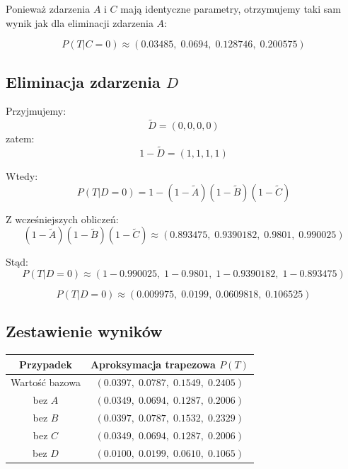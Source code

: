 \documentclass[11pt,a4paper]{article}
\begin{document}
Ponieważ zdarzenia $A$ i $C$ mają identyczne parametry, otrzymujemy taki sam wynik jak dla eliminacji zdarzenia $A$:

\[
P(T|C=0)\approx
(0.03485,\;0.0694,\;0.128746,\;0.200575)
\]

\subsection{Eliminacja zdarzenia $D$}

Przyjmujemy:
\[
\tilde{D}=(0,0,0,0)
\]
zatem:
\[
1-\tilde{D}=(1,1,1,1)
\]

Wtedy:
\[
P(T|D=0)=1-(1-\tilde{A})(1-\tilde{B})(1-\tilde{C})
\]

Z wcześniejszych obliczeń:
\[
(1-\tilde{A})(1-\tilde{B})(1-\tilde{C})\approx
(0.893475,\;0.9390182,\;0.9801,\;0.990025)
\]

Stąd:
\[
P(T|D=0)\approx
(1-0.990025,\;1-0.9801,\;1-0.9390182,\;1-0.893475)
\]

\[
P(T|D=0)\approx
(0.009975,\;0.0199,\;0.0609818,\;0.106525)
\]

\subsection{Zestawienie wyników}

\begin{center}
\begin{tabular}{cc}
\toprule
Przypadek & Aproksymacja trapezowa $P(T)$ \\
\midrule
Wartość bazowa & $(0.0397,\;0.0787,\;0.1549,\;0.2405)$ \\
bez $A$ & $(0.0349,\;0.0694,\;0.1287,\;0.2006)$ \\
bez $B$ & $(0.0397,\;0.0787,\;0.1532,\;0.2329)$ \\
bez $C$ & $(0.0349,\;0.0694,\;0.1287,\;0.2006)$ \\
bez $D$ & $(0.0100,\;0.0199,\;0.0610,\;0.1065)$ \\
\bottomrule
\end{tabular}
\end{center}
\end{document}
